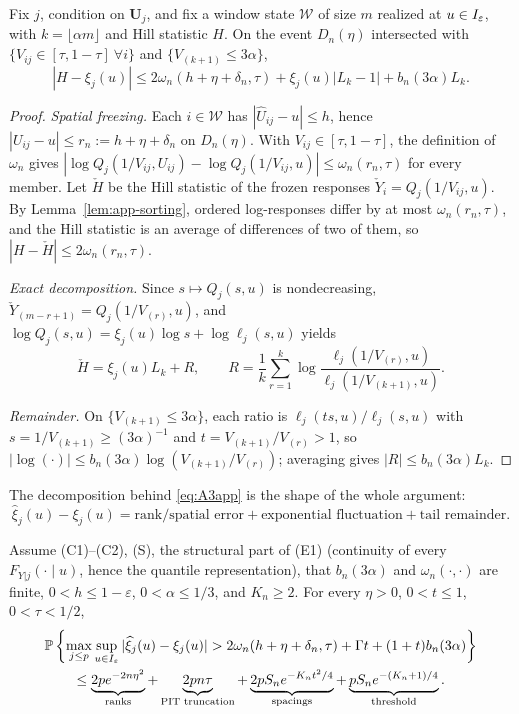 \begin{lemma}\label{lem:app-hill}
Fix $j$, condition on $\bm U_j$, and fix a window state $\mathcal W$ of
size $m$ realized at $u\in I_\varepsilon$, with $k=\lfloor\alpha m\rfloor$ and Hill
statistic $H$.  On the event $D_n(\eta)$ intersected with
$\{V_{ij}\in[\tau,1-\tau]\ \forall i\}$ and $\{V_{(k+1)}\le3\alpha\}$,
\begin{equation}
 |H-\xi_j(u)|
 \le2\omega_n(h+\eta+\delta_n,\tau)+\xi_j(u)|L_k-1|+b_n(3\alpha)L_k.
 \label{eq:A3app}
\end{equation}
\end{lemma}

\begin{proof}
\emph{Spatial freezing.}  Each $i\in\mathcal W$ has
$|\widehat U_{ij}-u|\le h$, hence $|U_{ij}-u|\le r_n:=h+\eta+\delta_n$ on
$D_n(\eta)$.  With $V_{ij}\in[\tau,1-\tau]$, the definition of
$\omega_n$ gives
$|\log Q_j(1/V_{ij},U_{ij})-\log Q_j(1/V_{ij},u)|\le\omega_n(r_n,\tau)$
for every member.  Let $\check H$ be the Hill statistic of the frozen
responses $\check Y_i=Q_j(1/V_{ij},u)$.  By Lemma~\ref{lem:app-sorting},
ordered log-responses differ by at most $\omega_n(r_n,\tau)$, and the Hill
statistic is an average of differences of two of them, so
$|H-\check H|\le2\omega_n(r_n,\tau)$.

\emph{Exact decomposition.}  Since $s\mapsto Q_j(s,u)$ is nondecreasing,
$\check Y_{(m-r+1)}=Q_j(1/V_{(r)},u)$, and
$\log Q_j(s,u)=\xi_j(u)\log s+\log\ell_j(s,u)$ yields
\[
 \check H=\xi_j(u)L_k+R,
 \qquad
 R=\frac1k\sum_{r=1}^k
 \log\frac{\ell_j(1/V_{(r)},u)}{\ell_j(1/V_{(k+1)},u)}.
\]

\emph{Remainder.}  On $\{V_{(k+1)}\le3\alpha\}$, each ratio is
$\ell_j(ts,u)/\ell_j(s,u)$ with $s=1/V_{(k+1)}\ge(3\alpha)^{-1}$ and
$t=V_{(k+1)}/V_{(r)}>1$, so
$|\log(\cdot)|\le b_n(3\alpha)\log(V_{(k+1)}/V_{(r)})$; averaging gives
$|R|\le b_n(3\alpha)L_k$.
\end{proof}

The decomposition behind \eqref{eq:A3app} is the shape of the whole
argument:
\[
 \widehat\xi_j(u)-\xi_j(u)
 =\text{rank/spatial error}
 +\text{exponential fluctuation}
 +\text{tail remainder}.
\]

\begin{proposition}
\label{thm:app-rank-profile}
Assume (C1)--(C2), (S), the structural part of (E1) (continuity of
every $F_{Y|j}(\cdot\mid u)$, hence the quantile representation), that
$b_n(3\alpha)$ and $\omega_n(\cdot,\cdot)$ are finite,
$0<h\le1-\varepsilon$, $0<\alpha\le1/3$, and $K_n\ge2$.  For every
$\eta>0$, $0<t\le1$, $0<\tau<1/2$,
\begin{align}
&\mathbb P\left\{\max_{j\le p}\sup_{u\in I_\varepsilon}
 |\widehat\xi_j(u)-\xi_j(u)|
 >2\omega_n(h+\eta+\delta_n,\tau)+\Gamma t+(1+t)b_n(3\alpha)\right\}
 \nonumber\\
&\qquad\le
 \underbrace{2pe^{-2n\eta^2}}_{\text{ranks}}
 +\underbrace{2pn\tau}_{\text{PIT truncation}}
 +\underbrace{2pS_ne^{-K_nt^2/4}}_{\text{spacings}}
 +\underbrace{pS_ne^{-(K_n+1)/4}}_{\text{threshold}}.
 \label{eq:A4app}
\end{align}
\end{proposition}

